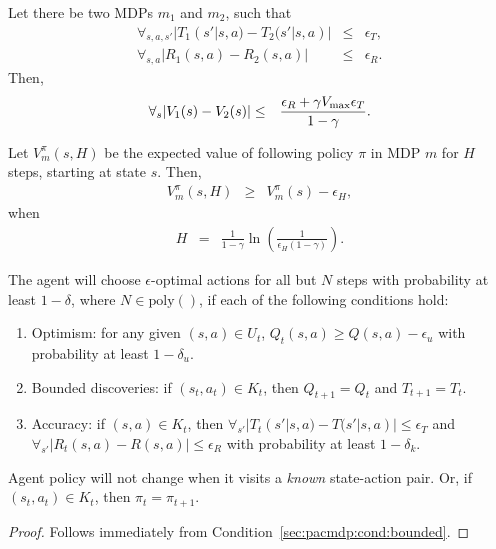 \begin{lemma}
Let there be two MDPs $m_1$ and $m_2$, such that
\begin{eqnarray}
\forall_{s,a,s'} |T_1(s'|s,a) - T_2(s'|s,a)| &\leq& \epsilon_T,\\
\forall_{s,a} |R_1(s,a) - R_2(s,a)| &\leq& \epsilon_R.
\end{eqnarray}
Then,
\begin{eqnarray}
\forall_s |V_1(s) - V_2(s)| &\leq& \frac {\epsilon_R + \gamma V_{\rm max} \epsilon_T} {1-\gamma}.
\end{eqnarray}
\end{lemma}

\begin{lemma}
\label{sec:pacmdp:horizon-error}
Let $V^\pi_m(s,H)$ be the expected value of following policy $\pi$ in MDP $m$ for $H$ steps, starting at state $s$. Then,
\begin{eqnarray}
V^\pi_m(s,H) &\geq& V^\pi_m(s) - \epsilon_H,
\end{eqnarray}
when
\begin{eqnarray}
H&=&\frac 1 {1-\gamma} \ln\left(\frac 1 {\epsilon_H (1-\gamma)}\right).
\end{eqnarray}
\end{lemma}

\begin{thm}
The agent \A will choose $\epsilon$-optimal actions for all but $N$ steps with probability at least $1-\delta$, where $N \in \mbox{poly}()$, if each of the following conditions hold:
\begin{enumerate}
\item
\label{sec:pacmdp:cond:opt}
Optimism: for any given $(s,a) \in U_t$, $Q_t(s,a) \geq Q(s,a) - \epsilon_u$ with probability at least $1-\delta_u$.
\item
\label{sec:pacmdp:cond:bounded}
Bounded discoveries: if $(s_t, a_t) \in K_t$, then $Q_{t+1} = Q_{t}$ and $T_{t+1} = T_{t}$.
\item
\label{sec:pacmdp:cond:acc}
Accuracy: if $(s,a) \in K_t$, then $\forall_{s'}|T_t(s'|s,a)-T(s'|s,a)| \leq \epsilon_T$ and $\forall_{s'}|R_t(s,a)-R(s,a)| \leq \epsilon_R$ with probability at least $1-\delta_k$.
\end{enumerate}
\end{thm}

\begin{lemma}
\label{sec:pacmdp:lemma:fixed-policy}
Agent \As policy will not change when it visits a \emph{known} state-action pair. Or, if $(s_t,a_t) \in K_t$, then $\pi_t = \pi_{t+1}$.
\end{lemma}
\begin{proof}
Follows immediately from Condition~\ref{sec:pacmdp:cond:bounded}.
\end{proof}

